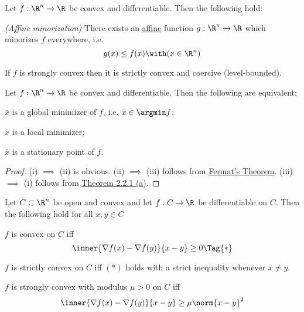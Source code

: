 \label{aa63a8a}

Let $f:\R^n\to\R$ be convex and differentiable. Then the following
hold:
\begin{enumerata}
	\item \textit{(Affine minorization)} There exists an
	\href{dcb7f73}{affine} function $g:\R^n\to\R$ which minorizes
	$f$ everywhere, i.e.
	$$
		g(x)\leq f(x)\with(x\in\R^n)
	$$
	\item If $f$ is strongly convex then it is strictly convex and
	coercive (level-bounded).
\end{enumerata}

\label{f2986e2}

Let $f:\R^n\to\R$ be convex and differentiable. Then the following
are equivalent:
\begin{enumerati}
	\item $\bar x$ is a global minimizer of $f$, i.e. $\bar x\in\argmin f$;
	\item $\bar x$ is a local minimizer;
	\item $\bar x$ is a stationary point of $f$.
\end{enumerati}

\begin{proof}
	(i) $\implies$ (ii) is obvious. (ii) $\implies$ (iii) follows from
	\href{dc165c9}{Fermat's Theorem}. (iii) $\implies$ (i) follows
	from \href{cd9cea7}{Theorem 2.2.1 (a)}.
\end{proof}

\label{a8ddd0c}

Let $C\subset\R^n$ be open and convex and let $f:C\to\R$ be
differentiable on $C$. Then the following hold for all $x,y\in C$
\begin{enumerata}
	\item $f$ is convex on $C$ iff
	\begin{equation*}
		\inner{\nabla f(x)-\nabla f(y)}{x-y}\geq0\Tag{*}
	\end{equation*}
	\item $f$ is strictly convex on $C$ iff $(*)$ holds with a strict
	inequality whenever $x\neq y$.
	\item $f$ is strongly convex with modulus $\mu>0$ on $C$ iff
	$$
		\inner{\nabla f(x)-\nabla f(y)}{x-y}\geq\mu\norm{x-y}^2
	$$
\end{enumerata}

\label{eeb9c30}

